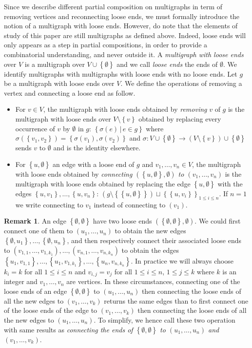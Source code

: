 \documentclass[11pt]{article}
\theoremstyle{definition}
\newtheorem{rema}[theo]{Remark}
\numberwithin{equation}{section}
\newcommand{\set}[1]{\left\{#1\right\}}
\begin{document}
Since we describe different partial composition on multigraphs in term of removing vertices and reconnecting loose ends, we must
formally introduce the notion of a multigraph with loose ends. However, do note that the elements of study of this paper are still multigraphs
as defined above. Indeed, loose ends will only appears as a step in partial compositions, in order to provide a combinatorial understanding,
and never outside it. 
A {\em multigraph with loose ends} over $V$ is a multigraph over $V\cup\set{\emptyset}$ and we call {\em loose ends} the ends of 
$\emptyset$. We identify multigraphs with multigraphs with loose ends with no loose ends. Let $g$ be a
multigraph with loose ends over $V$. We define the operations of removing a vertex and connecting a loose end as follow.
\begin{itemize}
    \item For $v\in V$, the multigraph with loose ends obtained by {\em removing} $v$ of $g$ is the multigraph with
    loose ends over $V\setminus\set{v}$ obtained by replacing every occurrence of $v$ by $\emptyset$ in $g$:
    $\set{\sigma(e)\,|\, e\in g}$ where $\sigma(\set{v_1,v_2}) = \set{\sigma(v_1),\sigma(v_2)}$ and 
    $\sigma:V\cup\set{\emptyset}\to (V\setminus \set{v})\cup\set{\emptyset}$ sends $v$ to $\emptyset$ and is the identity elsewhere. 
    \item For $\set{u,\emptyset}$ an edge with a loose end of $g$ and $v_1,\dots, v_n \in V$, the multigraph with loose ends obtained 
    by {\em connecting $(\set{u,\emptyset},\emptyset)$ to $(v_1,\dots, v_n)$} is the multigraph with loose ends obtained by replacing the edge 
    $\set{u,\emptyset}$ with the edges $\set{u,v_1},\dots,\set{u,v_n}$: $\left(g\setminus\set{\set{u,\emptyset}}\right)\sqcup\set{\set{u,v_i}}_{1\leq i\leq n}$. If $n=1$ we write connecting to $v_1$ instead of connecting to $(v_1)$.
\end{itemize}

\begin{rema}
    An edge $\set{\emptyset, \emptyset}$ have two loose ends $(\set{\emptyset, \emptyset}, \emptyset)$. We could first connect one of them
    to $(u_1,\dots, u_n)$ to obtain the new edges $\set{\emptyset, u_1}, \dots, \set{\emptyset, u_n}$, and then respectively connect their associated
    loose ends to $(v_{1,1}, \dots, v_{1,k_1}), \dots, (v_{n,1}, \dots, v_{n,k_n})$ to obtain the edges 
    $\set{u_1, v_{1,1}}, \dots, \set{u_1, v_{1,k_1}}, \dots, \set{u_n, v_{n,k_n}}$. In practice we will always choose $k_i = k$ for all $1\leq i \leq n$ 
    and $v_{i,j} = v_j$ for all $1\leq i \leq n$, $1\leq j \leq k$ where $k$ is an integer and $v_1,\dots, v_n$ are vertices. 
    In these circumstances, connecting one of the loose ends of an edge $\set{\emptyset, \emptyset}$ to $(u_1,\dots, u_n)$ then connecting the 
    loose ends of all the new edges to $(v_1,\dots, v_k)$ returns the same edges than to first connect one of the loose ends of the edge to 
    $(v_1,\dots, v_k)$ then connecting the loose ends of all the new edges to $(u_1,\dots, u_n)$. To simplify, we hence call these two operation with 
    same results as {\em connecting the ends of $\set{\emptyset, \emptyset}$ to $(u_1,\dots, u_n)$ and $(v_1,\dots, v_k)$}.
\end{rema}
\end{document}
